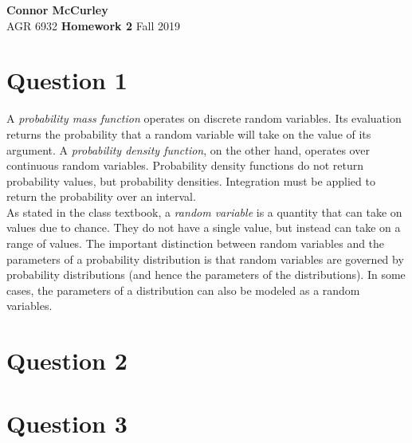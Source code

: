 \documentclass{article}[12 pt]
\begin{document}
	
\begin{center}
	\textbf{\Large Connor McCurley} \\
	AGR 6932  \qquad \quad \quad \textbf{\large Homework 2} \quad \quad \qquad Fall 2019 
\end{center}



\section*{Question 1}
A \textit{probability mass function} operates on discrete random variables.  Its evaluation returns the probability that a random variable will take on the value of its argument.  A \textit{probability  density function}, on the other hand, operates over continuous random variables.  Probability density functions do not return probability values, but probability densities. Integration must be applied to return the probability over an interval. \\

\noindent
As stated in the class textbook, a \textit{random variable} is a quantity that can take on values due to chance.  They do not have a single value, but instead can take on a range of values.  The important distinction between random variables and the parameters of a probability distribution is that random variables are governed by probability distributions (and hence the parameters of the distributions).  In some cases, the parameters of a distribution can also be modeled as a random variables. 


\section*{Question 2}


\section*{Question 3}


\end{document}

